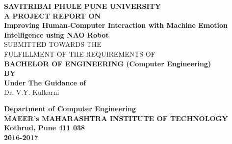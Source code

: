\documentclass[oneside,a4paper,12pt]{report}
\begin{document}
\setlength{\parindent}{0mm}
\begin{center}
{\bfseries SAVITRIBAI PHULE PUNE UNIVERSITY \\}
 \vspace*{1\baselineskip}
{\bfseries A  PROJECT REPORT ON \\}
 \vspace*{2\baselineskip}
{\bfseries \fontsize{16}{12} \selectfont Improving Human-Computer Interaction with Machine Emotion Intelligence using NAO Robot  \\ \vspace*{2\baselineskip}}
{\fontsize{12}{12} \selectfont SUBMITTED TOWARDS THE
 \\FULFILLMENT OF THE REQUIREMENTS OF \\

\vspace*{2\baselineskip}}
{\bfseries \fontsize{14}{12} \selectfont BACHELOR OF ENGINEERING (Computer
Engineering) \\
\vspace*{1\baselineskip}} 
{\bfseries \fontsize{14}{12} \selectfont BY \\ 
\vspace*{1\baselineskip}} 
\vspace*{2\baselineskip}
{\bfseries \fontsize{14}{12} \selectfont Under The Guidance of \\  
\vspace{\baselineskip}} 
Dr. V.Y. Kulkarni\\
\vspace{\baselineskip}
\begin{center}
	\textbf{Department of Computer Engineering}\\
	\bf{MAEER's MAHARASHTRA INSTITUTE OF TECHNOLOGY}\\
	\textbf{Kothrud, Pune 411 038}\\
	\textbf{2016-2017}
\end{center}

\end{center}

\newpage
\end{document}
